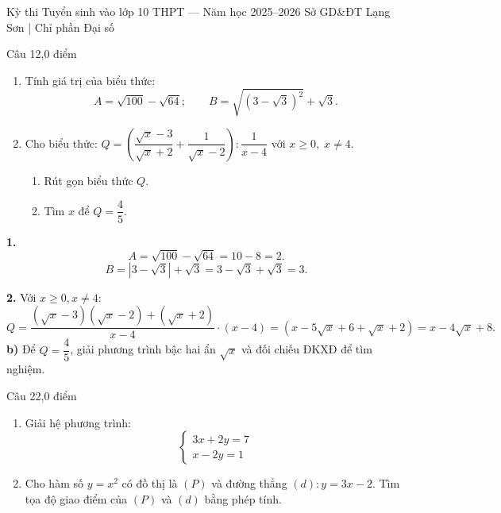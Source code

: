 ﻿%
%
  {Kỳ thi Tuyển sinh vào lớp 10 THPT — Năm học 2025--2026}%
  {Sở GD\&ĐT Lạng Sơn | Chỉ phần Đại số}

\begin{de_cau}{Câu 1}{2,0 điểm}
\begin{enumerate}[label=\arabic*.]
\item Tính giá trị của biểu thức:
\[A = \sqrt{100} - \sqrt{64};\qquad B = \sqrt{(3-\sqrt{3})^2} + \sqrt{3}.\]
\item Cho biểu thức: $Q = \left(\dfrac{\sqrt{x}-3}{\sqrt{x}+2} + \dfrac{1}{\sqrt{x}-2}\right) : \dfrac{1}{x-4}$ với $x \ge 0,\; x \neq 4$.
\begin{enumerate}[label=\alph*)]
\item Rút gọn biểu thức $Q$.
\item Tìm $x$ để $Q = \dfrac{4}{5}$.
\end{enumerate}
\end{enumerate}
\end{de_cau}

\begin{loi_giai_cau}
\textbf{1.}
\[A = \sqrt{100} - \sqrt{64} = 10 - 8 = \boxed{2}.\]
\[B = |3-\sqrt{3}| + \sqrt{3} = 3-\sqrt{3}+\sqrt{3} = \boxed{3}.\]

\textbf{2.} Với $x \ge 0, x \neq 4$:
\[Q = \frac{(\sqrt{x}-3)(\sqrt{x}-2) + (\sqrt{x}+2)}{x-4} \cdot (x-4) = (x - 5\sqrt{x} + 6 + \sqrt{x} + 2) = \boxed{x - 4\sqrt{x} + 8}.\]
\textbf{b)} Để $Q = \dfrac{4}{5}$, giải phương trình bậc hai ẩn $\sqrt{x}$ và đối chiếu ĐKXĐ để tìm nghiệm.
\end{loi_giai_cau}

\begin{de_cau}{Câu 2}{2,0 điểm}
\begin{enumerate}[label=\arabic*.]
\item Giải hệ phương trình: 
\[ \begin{cases} 3x + 2y = 7 \\ x - 2y = 1 \end{cases} \]
\item Cho hàm số $y = x^2$ có đồ thị là $(P)$ và đường thẳng $(d)\colon y = 3x - 2$. Tìm tọa độ giao điểm của $(P)$ và $(d)$ bằng phép tính.
\end{enumerate}
\end{de_cau}

